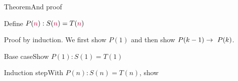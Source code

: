{\begin{frame}{Theorem}{And proof}
\Vskip{-3em}\begin{theorem}
\begin{center}
Define $P(\textcolor{purple}{n}):  S(\textcolor{purple}{n})=T(\textcolor{purple}{n})$ \\
\end{center}
\end{theorem}
Proof by induction.  We first show $P(1)$ and then show $P(k-1) \rightarrow\ P(k)$.
    
\end{frame}

\begin{frame}{Base case}{Show $P(1): S(1)=T(1)$}
\Vskip{-4em}\begin{center}\ThTop{\N}\end{center}
\SmallSkip{}
\begin{Reasoning}
\end{Reasoning}

\Vskip{-2em}
\end{frame}

\def\W{\ensuremath{w}}
\def\L{\ColorOne{\ensuremath{L}}}\def\R{\ColorTwo{\ensuremath{R}}}
\begin{frame}{Induction step}{With $P(n): S(n)=T(n)$, show }
\Vskip{-4.3em}\begin{center}\ThTop{\N}\end{center}
\SmallSkip{}


\end{frame}}

